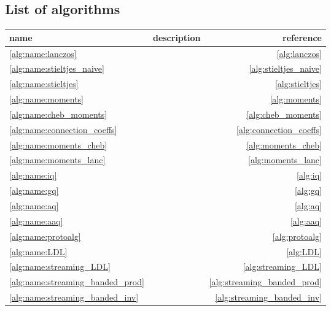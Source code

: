 \begin{landscape}
\section{List of algorithms}
\begin{center}
\fontsize{10}{14}\selectfont
\renewcommand{\arraystretch}{.9}
    \begin{tabularx}{\linewidth}{p{5.3cm}Xr}
    \toprule
    name & description & reference \\
    \midrule
    \ref{alg:name:lanczos} & \nameref{alg:lanczos}  & \cref{alg:lanczos} \\
    \midrule
    \ref{alg:name:stieltjes_naive} & \nameref{alg:stieltjes_naive}  & \cref{alg:stieltjes_naive} \\
    \ref{alg:name:stieltjes} & \nameref{alg:stieltjes}  & \cref{alg:stieltjes} \\
    \midrule
    \ref{alg:name:moments} & \nameref{alg:moments}  & \cref{alg:moments} \\
    \ref{alg:name:cheb_moments} & \nameref{alg:cheb_moments}  & \cref{alg:cheb_moments} \\
    \ref{alg:name:connection_coeffs} & \nameref{alg:connection_coeffs}  & \cref{alg:connection_coeffs} \\
    \ref{alg:name:moments_cheb} & \nameref{alg:moments_cheb}  & \cref{alg:moments_cheb} \\
    \ref{alg:name:moments_lanc} & \nameref{alg:moments_lanc}  & \cref{alg:moments_lanc} \\
    \ref{alg:name:iq} & \nameref{alg:iq}  & \cref{alg:iq} \\
    \ref{alg:name:gq} & \nameref{alg:gq}  & \cref{alg:gq} \\
    \ref{alg:name:aq} & \nameref{alg:aq}  & \cref{alg:aq} \\
    \ref{alg:name:aaq} & \nameref{alg:aaq}  & \cref{alg:aaq} \\
    \ref{alg:name:protoalg} & \nameref{alg:protoalg}  & \cref{alg:protoalg} \\
    \midrule
    \ref{alg:name:LDL} & \nameref{alg:LDL}  & \cref{alg:LDL} \\
    \ref{alg:name:streaming_LDL} & \nameref{alg:streaming_LDL}  & \cref{alg:streaming_LDL} \\
    \ref{alg:name:streaming_banded_prod} & \nameref{alg:streaming_banded_prod}  & \cref{alg:streaming_banded_prod} \\
    \ref{alg:name:streaming_banded_inv} & \nameref{alg:streaming_banded_inv}  & \cref{alg:streaming_banded_inv} \\

\end{tabularx}
\end{center}
\end{landscape}
